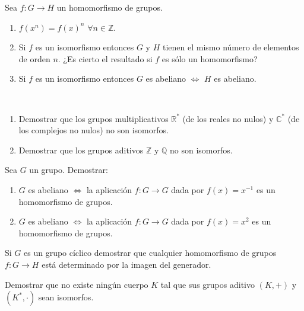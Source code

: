 \begin{ejercicio}\label{ej:2.35}
    Sea $f : G \to H$ un homomorfismo de grupos.
    \begin{enumerate}
        \item $f(x^n) = f(x)^n$ $\forall n \in \mathbb{Z}$.
        \item Si $f$ es un isomorfismo entonces $G$ y $H$ tienen el mismo número de elementos de orden $n$. ¿Es cierto el resultado si $f$ es sólo un homomorfismo?
        \item Si $f$ es un isomorfismo entonces $G$ es abeliano $\Leftrightarrow$ $H$ es abeliano.
    \end{enumerate}
\end{ejercicio}

\begin{ejercicio}\label{ej:2.36}~
    \begin{enumerate}
        \item Demostrar que los grupos multiplicativos $\mathbb{R}^{\ast}$ (de los reales no nulos) y $\mathbb{C}^{\ast}$ (de los complejos no nulos) no son isomorfos.
        \item Demostrar que los grupos aditivos $\mathbb{Z}$ y $\mathbb{Q}$ no son isomorfos.
    \end{enumerate}
\end{ejercicio}

\begin{ejercicio}\label{ej:2.37}
    Sea $G$ un grupo. Demostrar:
    \begin{enumerate}
        \item $G$ es abeliano $\iff$ la aplicación $f : G \to G$ dada por $f(x) = x^{-1}$ es un homomorfismo de grupos.
        \item $G$ es abeliano $\iff$ la aplicación $f : G \to G$ dada por $f(x) = x^2$ es un homomorfismo de grupos.
    \end{enumerate}
\end{ejercicio}


\begin{ejercicio}\label{ej:2.38}
    Si $G$ es un grupo cíclico demostrar que cualquier homomorfismo de grupos $f : G \to H$ está determinado por la imagen del generador.
\end{ejercicio}

\begin{ejercicio}\label{ej:2.39}
    Demostrar que no existe ningún cuerpo $K$ tal que sus grupos aditivo $(K, +)$ y $(K^{\ast}, \cdot)$ sean isomorfos.
\end{ejercicio}